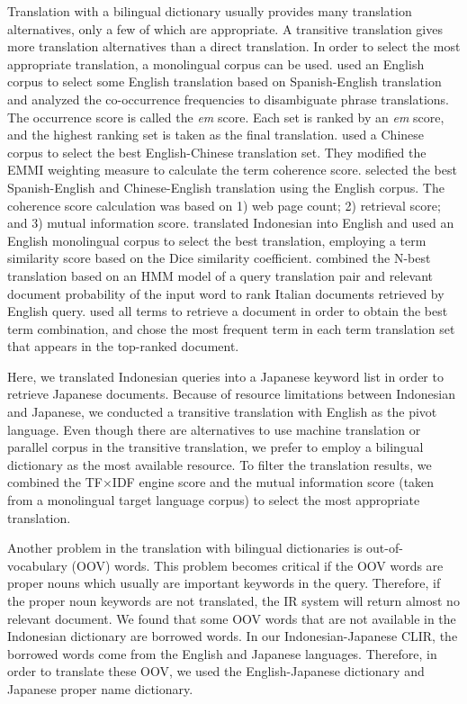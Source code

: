 \documentclass[english]{jnlp_1.3c}
\begin{document}
Translation with a bilingual dictionary usually provides many
translation alternatives, only a few of which are appropriate. A
transitive translation gives more translation alternatives than a direct
translation. In order to select the most appropriate translation, a
monolingual corpus can be used. \cite{ballesteros1998} used an English
corpus to select some English translation based on Spanish-English
translation and analyzed the co-occurrence frequencies to disambiguate
phrase translations. The occurrence score is called the \textit{em} score. Each
set is ranked by an \textit{em} score, and the highest ranking set is taken as
the final translation.  \cite{gao2001} used a Chinese corpus to select
the best English-Chinese translation set. They modified the EMMI
weighting measure to calculate the term coherence score. \cite{qu2002}
selected the best Spanish-English and Chinese-English translation using
the English corpus. The coherence score calculation was based on 1) web
page count; 2) retrieval score; and 3) mutual information score.
\cite{mirna2000} translated Indonesian into English and used an English
monolingual corpus to select the best translation, employing a term
similarity score based on the Dice similarity
coefficient. \cite{federico2002} combined the N-best translation based
on an HMM model of a query translation pair and relevant document
probability of the input word to rank Italian documents retrieved by
English query.  \cite{kishida2004} used all terms to retrieve a document
in order to obtain the best term combination, and chose the most
frequent term in each term translation set that appears in the
top-ranked document.

Here, we translated Indonesian queries into a Japanese keyword list in
order to retrieve Japanese documents. Because of resource limitations
between Indonesian and Japanese, we conducted a transitive translation
with English as the pivot language. Even though there are alternatives
to use machine translation or parallel corpus in the transitive
translation, we prefer to employ a bilingual dictionary as the most
available resource. To filter the translation results, we combined the
TF×IDF engine score and the mutual information score (taken from a
monolingual target language corpus) to select the most appropriate
translation.

Another problem in the translation with bilingual dictionaries is
out-of-vocabulary (OOV) words. This problem becomes critical if the OOV
words are proper nouns which usually are important keywords in the
query. Therefore, if the proper noun keywords are not translated, the IR
system will return almost no relevant document. We found that some OOV
words that are not available in the Indonesian dictionary are borrowed
words. In our Indonesian-Japanese CLIR, the borrowed words come from the
English and Japanese languages. Therefore, in order to translate these
OOV, we used the English-Japanese dictionary and Japanese proper name
dictionary.
\end{document}
